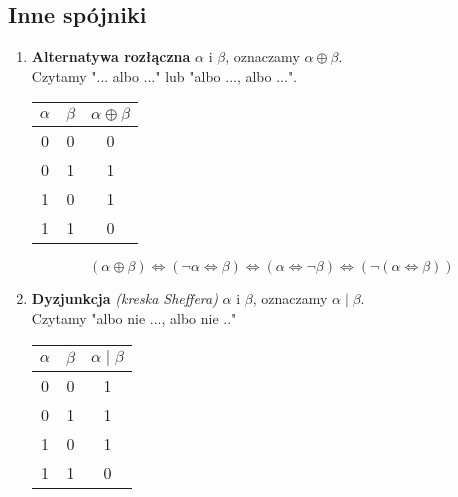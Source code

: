 \documentclass[a5paper,8pt]{article}
\begin{document}
        \subsection{Inne spójniki} %
        \label{sub:inne_spójniki}
            \begin{enumerate}
                \item \textbf{Alternatywa rozłączna} $\alpha$ i $\beta$, oznaczamy $\alpha \oplus \beta$.\\
                Czytamy "... albo ..." lub "albo ..., albo ...".\\

                \begin{center}
                    \begin{tabular}{|c|c|c|}
                      \hline 
                      $\alpha$ & $\beta$ & $\alpha \oplus \beta$\\
                      \hline
                      0 & 0 & 0\\
                      \hline
                      0 & 1 & 1\\
                      \hline
                      1 & 0 & 1\\
                      \hline
                      1 & 1 & 0\\
                      \hline
                    \end{tabular}
                \end{center}

                \begin{equation*}
                    (\alpha \oplus \beta) \Leftrightarrow (\neg \alpha \Leftrightarrow \beta) \Leftrightarrow (\alpha \Leftrightarrow \neg \beta) \Leftrightarrow (\neg (\alpha \Leftrightarrow \beta))
                \end{equation*}


                \item \textbf{Dyzjunkcja} \textit{(kreska Sheffera)} $\alpha$ i $\beta$, oznaczamy $\alpha \mid \beta$.\\
                Czytamy "albo nie ..., albo nie .."\\

                \begin{center}
                    \begin{tabular}{|c|c|c|}
                      \hline 
                      $\alpha$ & $\beta$ & $\alpha \mid \beta$\\
                      \hline
                      0 & 0 & 1\\
                      \hline
                      0 & 1 & 1\\
                      \hline
                      1 & 0 & 1\\
                      \hline
                      1 & 1 & 0\\
                      \hline
                    \end{tabular}
                \end{center}


\end{enumerate}
\end{document}
